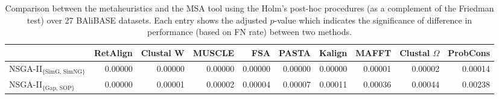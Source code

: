 \begin{table}[htbp]
	\small
	\centering
	\begin{adjustwidth}{-2cm}{-2cm}
	\caption{Comparison between the metaheuristics and the MSA tool using the Holm's post-hoc procedures (as a complement of the Friedman test) over 27 BAliBASE datasets. Each entry shows the adjusted $p$-value which indicates the significance of difference in performance (based on FN rate) between two methods.} %
	\begin{tabular}{|l|r|r|r|r|r|r|r|r|r|}
		\hline
		& RetAlign & Clustal W & MUSCLE & FSA   & PASTA & Kalign & MAFFT & Clustal $\Omega$ & ProbCons  \\
		\hline
		NSGA-II$_{\text{\{SimG, SimNG\}}}$& 0.00000 & 0.00000 & 0.00000 & 0.00000 & 0.00000 & 0.00000 & 0.00001 & 0.00002 & 0.00014  \\
		\hline
		NSGA-II$_{\text{\{Gap, SOP\}}}$ & 0.00000 & 0.00001 & 0.00002 & 0.00004 & 0.00007 & 0.00011 & 0.00036 & 0.00044 & 0.00238  \\
		\hline
	\end{tabular}%
	\label{tab:holm_test}%
	\end{adjustwidth}
\end{table}%



